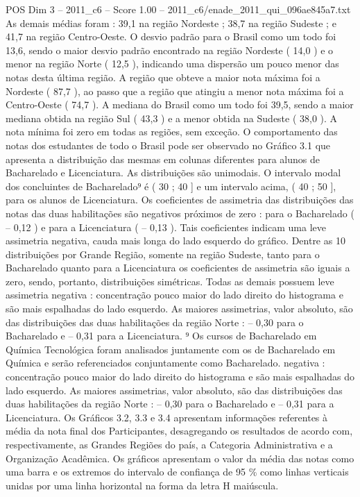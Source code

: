 \begin{textsample}{POS Dim 3 – 2011\_c6 – Score 1.00 – 2011\_c6/enade\_2011\_qui\_096ae845a7.txt}
As demais médias foram : 39,1 na região Nordeste ; 38,7 na região Sudeste ; e 41,7 na região Centro-Oeste.
O desvio padrão para o Brasil como um todo foi 13,6, sendo o maior desvio padrão encontrado na região Nordeste ( 14,0 ) e o menor na região Norte ( 12,5 ), indicando uma dispersão um pouco menor das notas desta última região.
A região que obteve a maior nota máxima foi a Nordeste ( 87,7 ), ao passo que a região que atingiu a menor nota máxima foi a Centro-Oeste ( 74,7 ).
A mediana do Brasil como um todo foi 39,5, sendo a maior mediana obtida na região Sul ( 43,3 ) e a menor obtida na Sudeste ( 38,0 ).
A nota mínima foi zero em todas as regiões, sem exceção.
O comportamento das notas dos estudantes de todo o Brasil pode ser observado no Gráfico 3.1 que apresenta a distribuição das mesmas em colunas diferentes para alunos de Bacharelado e Licenciatura.
As distribuições são unimodais.
O intervalo modal dos concluintes de Bacharelado⁹ é ( 30 ; 40 ] e um intervalo acima, ( 40 ; 50 ], para os alunos de Licenciatura.
Os coeficientes de assimetria das distribuições das notas das duas habilitações são negativos próximos de zero : para o Bacharelado ( – 0,12 ) e para a Licenciatura ( – 0,13 ).
Tais coeficientes indicam uma leve assimetria negativa, cauda mais longa do lado esquerdo do gráfico.
Dentre as 10 distribuições por Grande Região, somente na região Sudeste, tanto para o Bacharelado quanto para a Licenciatura os coeficientes de assimetria são iguais a zero, sendo, portanto, distribuições simétricas.
Todas as demais possuem leve assimetria negativa : concentração pouco maior do lado direito do histograma e são mais espalhadas do lado esquerdo.
As maiores assimetrias, valor absoluto, são das distribuições das duas habilitações da região Norte : – 0,30 para o Bacharelado e – 0,31 para a Licenciatura. ⁹ Os cursos de Bacharelado em Química Tecnológica foram analisados juntamente com os de Bacharelado em Química e serão referenciados conjuntamente como Bacharelado. negativa : concentração pouco maior do lado direito do histograma e são mais espalhadas do lado esquerdo.
As maiores assimetrias, valor absoluto, são das distribuições das duas habilitações da região Norte : – 0,30 para o Bacharelado e – 0,31 para a Licenciatura.
Os Gráficos 3.2, 3.3 e 3.4 apresentam informações referentes à média da nota final dos Participantes, desagregando os resultados de acordo com, respectivamente, as Grandes Regiões do país, a Categoria Administrativa e a Organização Acadêmica.
Os gráficos apresentam o valor da média das notas como uma barra e os extremos do intervalo de confiança de 95 \% como linhas verticais unidas por uma linha horizontal na forma da letra H maiúscula.

\end{textsample}
